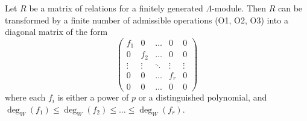 Let $R$ be a matrix of relations for a finitely generated $\Lambda$-module. Then $R$ can be transformed by a finite number of admissible operations (O1, O2, O3) into a diagonal matrix of the form
$$\begin{pmatrix}
f_1 & 0 & \dots & 0 & 0 \\
0 & f_2 & \dots & 0 & 0 \\
\vdots & \vdots & \ddots & \vdots & \vdots \\
0 & 0 & \dots & f_r & 0 \\
0 & 0 & \dots & 0 & 0
\end{pmatrix}$$
where each $f_i$ is either a power of $p$ or a distinguished polynomial, and $\deg_W(f_1) \le \deg_W(f_2) \le \dots \le \deg_W(f_r)$.
